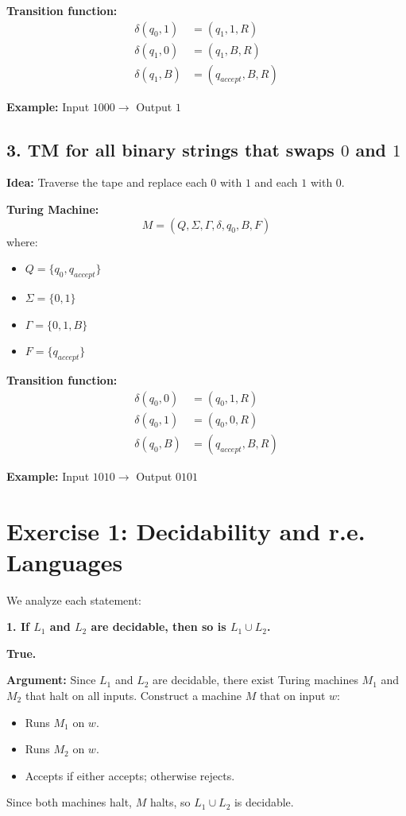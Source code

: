 \documentclass{article}
\theoremstyle{theorem}
\theoremstyle{definition}
\theoremstyle{remark}
\begin{document}
\textbf{Transition function:}
\[
\begin{aligned}
\delta(q_0, 1) &= (q_1, 1, R) \\
\delta(q_1, 0) &= (q_1, B, R) \\
\delta(q_1, B) &= (q_{accept}, B, R)
\end{aligned}
\]

\textbf{Example:} Input $1000 \rightarrow$ Output $1$

\bigskip

\subsection*{3. TM for all binary strings that swaps $0$ and $1$}

\textbf{Idea:} Traverse the tape and replace each $0$ with $1$ and each $1$ with $0$.

\textbf{Turing Machine:}
\[
M = (Q, \Sigma, \Gamma, \delta, q_0, B, F)
\]
where:
\begin{itemize}
    \item $Q = \{q_0, q_{accept}\}$
    \item $\Sigma = \{0,1\}$
    \item $\Gamma = \{0,1,B\}$
    \item $F = \{q_{accept}\}$
\end{itemize}

\textbf{Transition function:}
\[
\begin{aligned}
\delta(q_0, 0) &= (q_0, 1, R) \\
\delta(q_0, 1) &= (q_0, 0, R) \\
\delta(q_0, B) &= (q_{accept}, B, R)
\end{aligned}
\]

\textbf{Example:} Input $1010 \rightarrow$ Output $0101$

\section*{Exercise 1: Decidability and r.e. Languages}

We analyze each statement:

\bigskip

\textbf{1. If $L_1$ and $L_2$ are decidable, then so is $L_1 \cup L_2$.}

\textbf{True.}

\textbf{Argument:}  
Since $L_1$ and $L_2$ are decidable, there exist Turing machines $M_1$ and $M_2$ that halt on all inputs.  
Construct a machine $M$ that on input $w$:
\begin{itemize}
    \item Runs $M_1$ on $w$.
    \item Runs $M_2$ on $w$.
    \item Accepts if either accepts; otherwise rejects.
\end{itemize}
Since both machines halt, $M$ halts, so $L_1 \cup L_2$ is decidable.
\end{document}
